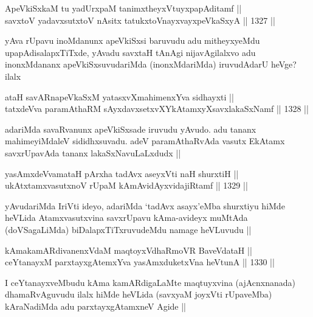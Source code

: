 \begin{shl}
ApeVkiSxkaM tu yadUrxpaM tanimxtheyxVtuyxpapAditamf ||  \\
savxtoV yadavxsutxtoV nAsitx tatukxtoV\s nayxvayxpeVkaSxyA ||  1327 ||  
\end{shl}

\begin{artha}
yAva rUpavu inoMdanunx apeVkiSxsi baruvudu adu mitheyxyeMdu upapAdisalapxTiTxde, yAvadu savxtaH tAnAgi nijavAgilalxvo adu inonxMdananx apeVkiSxsuvudariMda (inonxMdariMda) iruvudAdarU heVge? ilalx
\end{artha}

\begin{shl}
ataH savARnapeVkaSxM yatasxvXmahimenxYva sidhayxti || \\
tatxdeVva paramAthaRM sAyxdavxsetxvXYkAtamxyXsavxlakaSxNamf ||  1328 ||  
\end{shl}

\begin{artha}
adariMda savaRvanunx apeVkiSxsade iruvudu yAvudo. adu tananx mahimeyiMdaleV sididhxsuvadu. adeV paramAthaRvAda vasutx EkAtamx savxrUpavAda tananx lakaSxNavuLaLxdudx ||
\end{artha}

\begin{shl}
yasAmxdeVvamataH pArxha tadAvx aseyxVti naH shurxtiH || \\
ukAtxtamxvasutxnoV rUpaM kAmAvidAyxvidajiRtamf ||  1329 ||  
\end{shl}

\begin{artha}
yAvudariMda IriVti ideyo, adariMda `tadAvx asayx'eMba shurxtiyu hiMde heVLida Atamxvasutxvina savxrUpavu kAma-avideyx muMtAda (doVSagaLiMda) biDalapxTiTxruvudeMdu namage heVLuvudu ||
\end{artha}


\begin{shl}
kAmakamARdivanenxVdaM maqtoyxVdhaRmoVR BaveVdataH || \\
ceYtanayxM parxtayxgAtemxYva yasAmxduketxVna heVtunA ||  1330 ||  
\end{shl}

\begin{artha}
I ceYtanayxveMbudu kAma kamARdigaLaMte maqtuyxvina (ajAcnxnanada) dhamaRvAguvudu ilalx hiMde heVLida (savxyaM joyxVti rUpaveMba) kAraNadiMda adu parxtayxgAtamxneV Agide ||
\end{artha}

